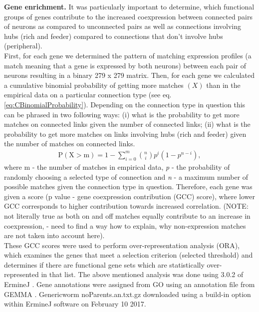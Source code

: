 \documentclass[10pt,letterpaper]{article}
\begin{document}
\textbf{Gene enrichment.}
It was particularly important to determine, which functional groups of genes contribute to the increased coexpression between connected pairs of neurons as compared to unconnected pairs as well as connections involving hubs (rich and feeder) compared to connections that don't involve hubs (peripheral). \\
First, for each gene we determined the pattern of matching expression profiles (a match meaning that a gene is expressed by both neurons) between each pair of neurons resulting in a binary 279 x 279 matrix.
Then, for each gene we calculated a cumulative binomial probability of getting more matches $(X)$ than in the empirical data on a particular connection type (see eq. \ref{eq:CBinomialProbability}). 
Depending on the connection type in question this can be phrased in two following ways: (i) what is the probability to get more matches on connected links given the number of connected links; (ii) what is the probability to get more matches on links involving hubs (rich and feeder) given the number of matches on connected links. 
\begin{eqnarray}
	\label{eq:CBinomialProbability}
     \mathrm{P(X>m)} = 1 - \sum_{\textit{i}=0}^{m}\binom{n}{i} p^{\textit{i}}(1-p^{n-\textit{i}}), 
\end{eqnarray}
where m - the number of matches in empirical data, \textit{p} - the probability of randomly choosing a selected type of connection and \textit{n} - a maximum number of possible matches given the connection type in question. 
Therefore, each gene was given a score (p value - gene coexpression contribution (GCC) score), where lower GCC corresponds to higher contribution towards increased correlation. 
(NOTE: not literally true as both on and off matches equally contribute to an increase in coexpression, - need to find a way how to explain, why non-expression matches are not taken into account here). \\
These GCC scores were used to perform over-representation analysis (ORA), which examines the genes that meet a selection criterion (selected threshold) and determines if there are functional gene sets which are statistically over-represented in that list. 
The above mentioned analysis was done using 3.0.2 of ErmineJ \cite{Gillis2010}. 
Gene annotations were assigned from GO \cite{Ashburner2000} using an annotation file from GEMMA \cite{Zoubarev2012}.  
Generic\textunderscore worm \textunderscore noParents.an.txt.gz downloaded using a build-in option within ErmineJ software on February 10 2017. 
\end{document}
